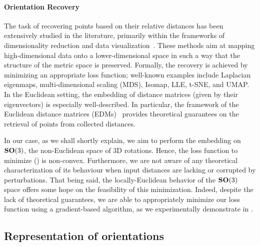 \paragraph{Orientation Recovery}
The task of recovering points based on their relative distances has been extensively studied in the literature, primarily within the frameworks of dimensionality reduction and data visualization~\cite{belkin2003laplacian,kruskal1978multidimensional, maaten2008visualizing, mcinnes2018umap,dokmanic2015euclidean}.
These methods aim at mapping high-dimensional data onto a lower-dimensional space in such a way that the structure of the metric space is preserved.
Formally, the recovery is achieved by minimizing an appropriate loss function; well-known examples include Laplacian eigenmaps, multi-dimensional scaling (MDS), Isomap, LLE, t-SNE, and UMAP.
In the Euclidean setting, the embedding of distance matrices (given by their eigenvectors) is especially well-described.
In particular, the framework of the Euclidean distance matrices (EDMs)~\cite{dokmanic2015euclidean} provides theoretical guarantees on the retrieval of points from collected distances.

In our case, as we shall shortly explain, we aim to perform the embedding on $\mathrm{\mathbf{SO}}(3)$, the non-Euclidean space of 3D rotations. Hence, the loss function to minimize () is non-convex. Furthermore, we are not aware of any theoretical characterization of its behaviour when input distances are lacking or corrupted by perturbations. That being said, the locally-Euclidean behavior of the $\mathrm{\mathbf{SO}}(3)$ space offers some hope on the feasibility of this minimization.
Indeed, despite the lack of theoretical guarantees, we are able to appropriately minimize our loss function using a gradient-based algorithm, as we experimentally demonstrate in .


\subsection{Representation of orientations}\label{sec:method:orientation-representation}

